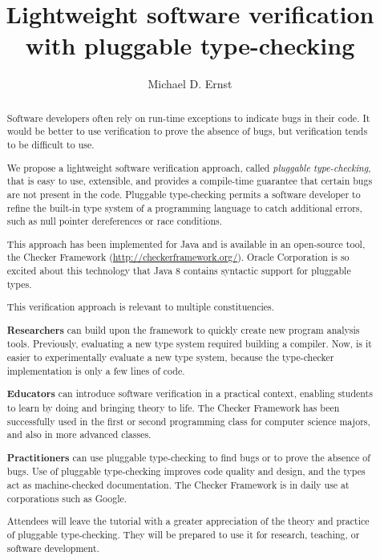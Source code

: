 \documentclass{llncs} %
\begin{document}
\title{Lightweight software verification \\ with pluggable type-checking}
\author{Michael D. Ernst}
\maketitle

\begin{abstract} %

Software developers often rely on run-time exceptions to indicate bugs
in their code.  It would be better to use verification to prove the absence
of bugs, but verification tends to be difficult to use.

We propose a lightweight software verification approach, called \emph{pluggable
type-checking}, that is easy to use, extensible, and provides a compile-time
guarantee that certain bugs are not present in the code.  Pluggable
type-checking permits a software developer to refine the built-in type
system of a programming language to catch additional errors, such as null
pointer dereferences or race conditions.

This approach has been implemented for Java and is available in an
open-source tool, the Checker Framework
(\url{http://checkerframework.org/}).  Oracle Corporation is so excited
about this technology that Java 8 contains syntactic support for pluggable
types.

This verification approach is relevant to multiple constituencies.

\textbf{Researchers} can build upon the framework to quickly create new
program analysis tools.  Previously, evaluating a new type system required
building a compiler.  Now, is it easier to experimentally evaluate a new
type system, because the type-checker implementation is only a few 
lines of code.

\textbf{Educators} can introduce software verification in a practical
context, enabling students to learn by doing and bringing theory to life.
The Checker Framework has been successfully used in
the first or second programming class for computer science majors, and also
in more advanced classes.

\textbf{Practitioners} can use pluggable type-checking to find bugs or to
prove the absence of bugs.  Use of pluggable type-checking improves code
quality and design, and the types act as machine-checked documentation.
The Checker Framework is in daily use at corporations such as Google.


Attendees will leave the tutorial with a greater appreciation of the theory and
practice of pluggable type-checking.  They will be prepared to use it
for research, teaching, or software development.


\end{abstract}
\end{document}
